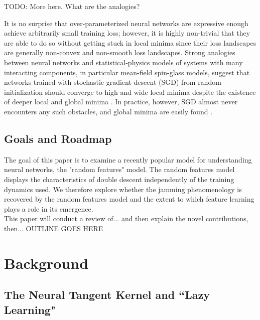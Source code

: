 \documentclass[a4paper, 12pt]{article}
\begin{document}
TODO: More here. What are the analogies? 


It is no surprise that over-parameterized neural networks are expressive enough achieve arbitrarily small training loss; however, it is highly non-trivial that they are able to do so without getting stuck in local minima since their loss landscapes are generally non-convex and non-smooth loss landscapes. Strong analogies between neural networks and statistical-physics models of systems with many interacting components, in particular mean-field spin-glass models, suggest that networks trained with stochastic gradient descent (SGD) from random initialization should converge to high and wide local minima despite the existence of deeper local and global minima \cite{choromanskaLossSurfacesMultilayer}. In practice, however, SGD almost never encounters any such obstacles, and global minima are easily found \cite{goodfellowQualitativelyCharacterizingNeural2015}.

\subsection{Goals and Roadmap}

The goal of this paper is to examine a recently popular model for understanding neural networks, the "random features" model. The random features model displays the characteristics of double descent independently of the training dynamics used. We therefore explore whether the jamming phenomenology is recovered by the random features model and the extent to which feature learning plays a role in its emergence.\\


This paper will conduct a review of... and then explain the novel contributions, then... OUTLINE GOES HERE

\section{Background}
\subsection{The Neural Tangent Kernel and ``Lazy Learning"}
\end{document}
